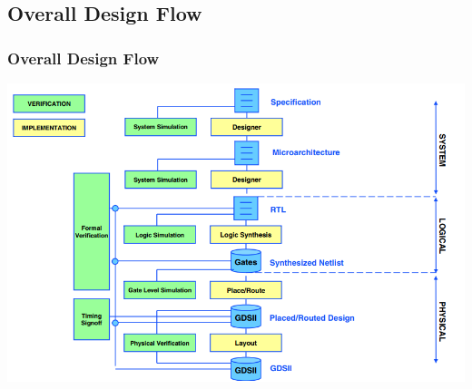 \documentclass[compress]{beamer}
\begin{document}
\subsection[flow]{Overall Design Flow}
\begin{frame}
	\frametitle{Overall Design Flow}
		\begin{center}
		\includegraphics[width=\textwidth]{flow}
	\end{center}
\end{frame}
\end{document}
